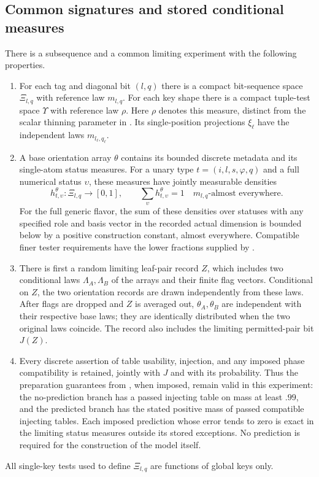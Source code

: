 \subsection{Common signatures and stored conditional measures}

\begin{lemma}
\label{lem:limit-model}
There is a subsequence and a common limiting experiment with the
following properties.
\begin{enumerate}[label=\textup{(\roman*)}]
\item For each tag and diagonal bit $(l,q)$ there is a compact
bit-sequence space $\Xi_{l,q}$ with reference law $m_{l,q}$.
For each key shape there is a compact tuple-test space $\Upsilon$
with reference law $\rho$. Here $\rho$ denotes this measure,
distinct from the scalar thinning parameter in .
Its single-position projections
$\xi_\ell$ have the independent laws $m_{l_\ell,q_\ell}$.
\item A base orientation array $\theta$ contains its bounded discrete
metadata and its single-atom status measures. For a unary type
$t=(i,l,s,\varphi,q)$ and a full numerical status $\upsilon$, these measures
have jointly measurable densities
\begin{equation}
\label{eq:limit-unary-densities}
h^\theta_{t,\upsilon}:\Xi_{l,q}\longrightarrow[0,1],\qquad
\sum_\upsilon h^\theta_{t,\upsilon}=1\quad m_{l,q}\text{-almost everywhere}.
\end{equation}
For the full generic flavor, the sum of these densities over statuses
with any specified role and basis vector in the recorded actual dimension
is bounded below by a positive construction constant, almost everywhere.
Compatible finer tester
requirements have the lower fractions supplied by
.
\item There is first a random limiting leaf-pair record $Z$, which
includes two conditional laws $\Lambda_A,\Lambda_B$ of the arrays and
their finite flag vectors. Conditional on $Z$, the two orientation
records are drawn independently from these laws. After flags are
dropped and $Z$ is averaged out, $\theta_A,\theta_B$ are independent
with their respective base laws; they are identically distributed when
the two original laws coincide. The record also includes the limiting
permitted-pair bit $J(Z)$.
\item Every discrete assertion of table usability, injection, and any
imposed phase compatibility is retained, jointly with $J$ and with its
probability. Thus the preparation guarantees from
, when imposed, remain valid in this
experiment: the no-prediction branch has a passed injecting table on
mass at least $.99$, and the predicted branch has the stated positive
mass of passed compatible injecting tables. Each imposed prediction
whose error tends to zero is exact in the limiting status measures
outside its stored exceptions. No prediction is required for the
construction of the model itself.
\end{enumerate}
All single-key tests used to define $\Xi_{l,q}$ are functions of global
keys only.
\end{lemma}

